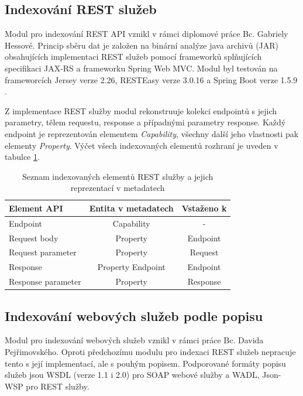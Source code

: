 \documentclass[czech,DP]{thesiskiv}
\begin{document}
\subsection{Indexování REST služeb}

Modul pro indexování REST API vznikl v rámci diplomové práce Bc. Gabriely Hessové. Princip sběru dat je založen na binární analýze java archivů (JAR) obsahujících implementaci REST služeb pomocí frameworků splňujících specifikaci JAX-RS a frameworku Spring Web MVC. Modul byl testován na frameworcích Jersey verze 2.26, RESTEasy verze 3.0.16 a  Spring Boot verze 1.5.9 \cite{hessova2015rest}.

Z implementace REST služby modul rekonstruuje kolekci endpointů s jejich parametry, tělem requestu, response a případnými parametry response. Každý endpoint je reprezentován elementem \textit{Capability}, všechny další jeho vlastnosti pak elementy \textit{Property}. Výčet všech indexovaných elementů rozhraní je uveden v tabulce \ref{tab:rest-indexed}.

\begin{table}[h]
	\centering
	\begin{tabular}{|l | c | c |}
		\hline
		Element API & Entita v metadatech & Vstaženo k\\
		\hline
		\hline
		Endpoint & Capability & - \\
		\hline
		Request body & Property & Endpoint \\
		\hline
		Request parameter & Property & Request \\
		\hline
		Response & Property Endpoint & Endpoint \\
		\hline
		Response parameter & Property & Response \\
		\hline
	\end{tabular}
	\caption{Seznam indexovaných elementů REST služby a jejich reprezentací v metadatech}
	\label{tab:rest-indexed}
\end{table}

\subsection{Indexování webových služeb podle popisu}

Modul pro indexování webových služeb vznikl v rámci práce Bc. Davida Pejřimovského. Oproti předchozímu modulu pro indexaci REST služeb nepracuje tento s její implementací, ale s pouhým popisem. Podporované formáty popisu služeb jsou WSDL (verze 1.1 i 2.0) pro SOAP webové služby a WADL, Json-WSP pro REST služby\cite{pejrimovsky2015ws}.
\end{document}
